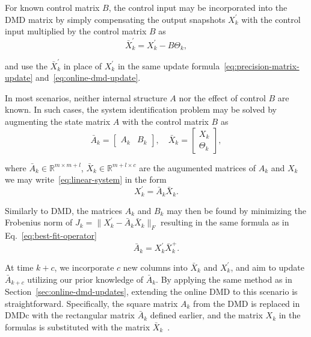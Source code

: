 For known control matrix \(B\), the control input may be incorporated into the DMD matrix by simply compensating the output snapshots \(X^\prime_k\) with the control input multiplied by the control matrix \(B\) as
\begin{equation}\label{eq:control-compensation}
	\bar{X}^\prime_k = X^\prime_k - B \Theta_k,
\end{equation}

and use the \(\bar{X}^\prime_k\) in place of \(X^\prime_k\) in the same update formula~\eqref{eq:precision-matrix-update} and~\eqref{eq:online-dmd-update}.

In most scenarios, neither internal structure \(A\) nor the effect of control \(B\) are known. In such cases, the system identification problem may be solved by augmenting the state matrix \(A\) with the control matrix \(B\) as
\begin{equation}\label{eq:augmented-matrix}
	\bar{A}_k = \begin{bmatrix} A_k & B_k \end{bmatrix}, \quad \bar{X}_k = \begin{bmatrix} X_k \\ \Theta_k \end{bmatrix} ,
\end{equation}

where \(\bar{A}_k \in \mathbb{R}^{m \times m + l}\), \(\bar{X}_k \in \mathbb{R}^{m + l \times c}\) are the augumented matrices of \(A_k\) and \(X_k\) we may write~\eqref{eq:linear-system} in the form
\begin{equation*}
	X^\prime_k = \bar{A}_k \bar{X}_k.
\end{equation*}

Similarly to DMD, the matrices \(A_k\) and \(B_k\) may then be found by minimizing the Frobenius norm of \(J_k = \|X^\prime_k - \bar{A}_k \bar{X}_k\|_F\) resulting in the same  formula as in Eq.~\eqref{eq:best-fit-operator}
\begin{equation*}
	\bar{A}_k = X^\prime_k \bar{X}_k^+.
\end{equation*}

At time \(k+c\), we incorporate \(c\) new columns into \(\bar{X}_k\) and \(X^\prime_k\), and aim to update \(\bar{A}_{k+c}\) utilizing our prior knowledge of \(\bar{A}_k\). By applying the same method as in Section~\ref{sec:online-dmd-updates}, extending the online DMD to this scenario is straightforward. Specifically, the square matrix \(A_k\) from the DMD is replaced in DMDc with the rectangular matrix \(\bar{A}_k\) defined earlier, and the matrix \(X_k\) in the formulas is substituted with the matrix \(\bar{X}_k\)~\citep{Zhang2019}.

